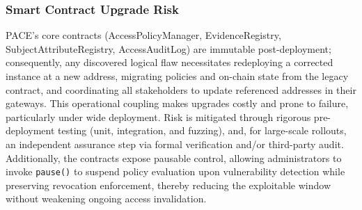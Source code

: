 \documentclass[pdflatex,sn-mathphys-num]{sn-jnl}
\begin{document}



\subsubsection{Smart Contract Upgrade Risk}
PACE's core contracts (AccessPolicyManager, EvidenceRegistry, SubjectAttributeRegistry, AccessAuditLog) are immutable post-deployment; consequently, any discovered logical flaw necessitates redeploying a corrected instance at a new address, migrating policies and on-chain state from the legacy contract, and coordinating all stakeholders to update referenced addresses in their gateways. This operational coupling makes upgrades costly and prone to failure, particularly under wide deployment. Risk is mitigated through rigorous pre-deployment testing (unit, integration, and fuzzing), and, for large-scale rollouts, an independent assurance step via formal verification and/or third-party audit. Additionally, the contracts expose pausable control, allowing administrators to invoke \texttt{pause()} to suspend policy evaluation upon vulnerability detection while preserving revocation enforcement, thereby reducing the exploitable window without weakening ongoing access invalidation.
\end{document}
